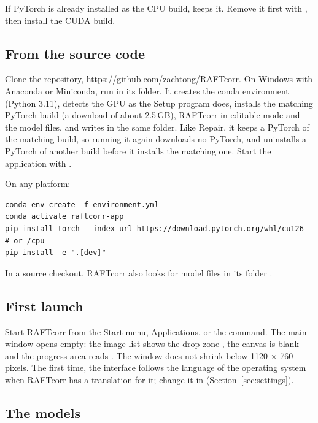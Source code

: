 If PyTorch is already installed as the CPU build,  keeps
it. Remove it first with , then install the CUDA build.

\subsection{From the source code}
\label{sec:installing-source}

Clone the repository, \url{https://github.com/zachtong/RAFTcorr}. On Windows with Anaconda or
Miniconda, run  in its folder. It creates the conda environment
 (Python 3.11), detects the GPU as the Setup program does, installs the
matching PyTorch build (a download of about 2.5\,GB), RAFTcorr in editable mode and the model
files, and writes  in the same folder. Like Repair, it keeps a PyTorch of the
matching build, so running it again downloads no PyTorch, and uninstalls a PyTorch of another
build before it installs the matching one. Start the application with
.

On any platform:

\begin{lstlisting}
conda env create -f environment.yml
conda activate raftcorr-app
pip install torch --index-url https://download.pytorch.org/whl/cu126  # or /cpu
pip install -e ".[dev]"
\end{lstlisting}

In a source checkout, RAFTcorr also looks for model files in its folder .

\subsection{First launch}
\label{sec:installing-first}

Start RAFTcorr from the Start menu, Applications,  or the  command.
The main window opens empty: the image list shows the drop zone ,
the canvas is blank and the progress area reads . The window does not shrink below
1120 $\times$ 760 pixels. The first time, the interface follows the language of the operating
system when RAFTcorr has a translation for it; change it in 
(Section~\ref{sec:settings}).

\subsection{The models}
\label{sec:installing-models}

